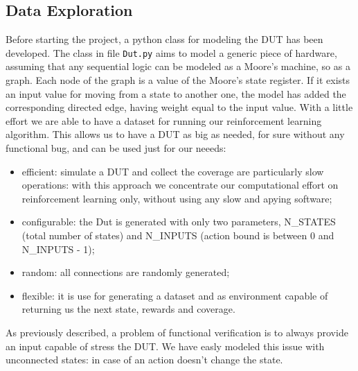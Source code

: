 \documentclass{article}
\begin{document}
\subsection{Data Exploration}
% 
% 
% 
Before starting the project, a python class for modeling the DUT has been developed. The class in file \texttt{Dut.py} aims to model a generic piece of hardware, assuming that any sequential logic can be modeled as a Moore's machine, so as a graph. Each node of the graph is a value of the Moore's state register. If it exists an input value for moving from a state to another one, the model has added the corresponding directed edge, having weight equal to the input value. With a little effort we are able to have a dataset for running our reinforcement learning algorithm. This allows us to have a DUT as big as needed, for sure without any functional bug, and can be used just for our neeeds:
\begin{itemize}
\item efficient: simulate a DUT and collect the coverage are particularly slow operations: with this approach we concentrate our computational effort on reinforcement learning only, without using any slow and apying software;
\item configurable: the Dut is generated with only two parameters, N\_STATES (total number of states) and N\_INPUTS (action bound is between 0 and N\_INPUTS - 1);
\item random: all connections are randomly generated;
\item flexible: it is use for generating a dataset and as environment capable of returning us the next state, rewards and coverage.
\end{itemize}
As previously described, a problem of functional verification is to always provide an input capable of stress the DUT. We have easly modeled this issue with unconnected states: in case of an action doesn't change the state.
\end{document}
